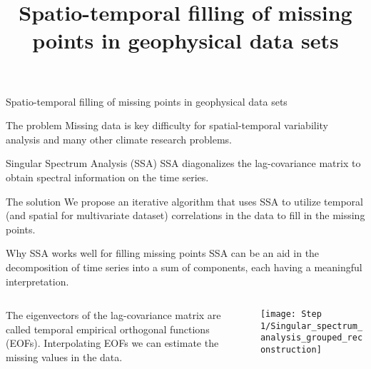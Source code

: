 \documentclass[12pt,pdf,hyperref={unicode}]{beamer}
\title{Spatio-temporal filling of missing points in geophysical data sets}
\begin{document}
\setcounter{page}{2}%
\begin{frame}{Spatio-temporal filling of missing points in geophysical data sets} 
\begin{block}{The problem}
Missing data is key difficulty for spatial-temporal variability analysis and many other climate research problems.
\end{block}
\begin{block}{Singular Spectrum Analysis (SSA)}
SSA diagonalizes the lag-covariance matrix to obtain spectral information on the time series.
\end{block}
\begin{block}{The solution} We propose an iterative algorithm that uses SSA to utilize temporal (and spatial for multivariate dataset) correlations in the data to fill in the missing points.
\end{block}
\end{frame}
\begin{frame}{Why SSA works well for filling missing points}
SSA can be an aid in the decomposition of time series into a sum of components, each having a meaningful interpretation.
\bigskip
\begin{columns}
\begin{column}{0.3\textwidth}
The  eigenvectors of the lag-covariance matrix
are called temporal empirical orthogonal functions (EOFs). Interpolating EOFs we can estimate the missing values in the data.
\end{column}
\begin{column}{0.7\textwidth}
	\texttt{[image: Step 1/Singular\_spectrum\_analysis\_grouped\_reconstruction]}      
\end{column}
\end{columns}
\end{frame}
\end{document}
